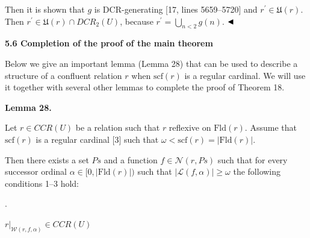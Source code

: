 \documentclass[10pt,a4paper]{amsart}
\begin{document}
 
  
 
 
Then it is shown that $g$ is DCR-generating [17, lines 5659–5720] and $r^{\prime}\in\mathfrak{U}(r)$. Then $r^{\prime}\in\mathfrak{U}(r)\cap DCR_{2}(U)$, because $r^{\prime}=\bigcup_{n<2}g(n)$. $\hfill\blacktriangleleft$\par
 
 
 
 
 
\par\medskip\noindent\textbf{5.6 Completion of the proof of the main theorem}\par
 
 
Below we give an important lemma (Lemma 28) that can be used to describe a structure of a confluent relation $r$ when $\mathrm{scf}(r)$ is a regular cardinal. We will use it together with several other lemmas to complete the proof of Theorem 18.\par
 
 
 
\par\medskip\noindent\textbf{Lemma 28.}\par
 
 
Let $r\in CCR(U)$ be a relation such that $r$ reflexive on $\mathrm{Fld}(r)$. Assume that $\mathrm{scf}(r)$ is a regular cardinal [3] such that $\omega<\mathrm{scf}(r)=|\mathrm{Fld}(r)|$.\par
 
 
 
Then there exists a set $Ps$ and a function $f\in\mathcal{N}(r,Ps)$ such that for every successor ordinal $\alpha\in[0,|\mathrm{Fld}(r)|)$ such that $|\mathcal{L}(f,\alpha)|\geq\omega$ the following conditions 1–3 hold:\par
  
\par{}. 
 
$r|_{\mathcal{W}(r,f,\alpha)}\in CCR(U)$\par
 
\end{document}
